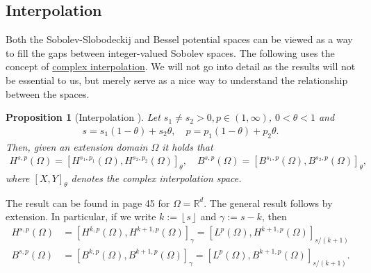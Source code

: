 \documentclass[
    a4paper,
    DIV=14,
    abstract=true,
    numbers=noenddot
]
{scrartcl}
\newtheorem{proposition}[theorem]{Proposition}
\theoremstyle{definition}
\newcommand{\R}{\mathbb{R}}
\begin{document}
\subsection{Interpolation}\label{interpolation section}
Both the Sobolev-Slobodeckij and Bessel potential spaces can be viewed as a way to fill the gaps between integer-valued Sobolev spaces. The following uses the concept of \href{https://en.wikipedia.org/wiki/Interpolation_space}{complex interpolation}. We will not go into detail as the results will not be essential to us, but merely serve as a nice way to understand the relationship between the spaces.
\begin{proposition}[Interpolation ]\label{interpolation}
    Let $s_1 \neq s_2 >0, p \in (1, \infty)$, $0<\theta<1$ and
    \begin{align*}
        s=s_1(1-\theta)+s_2 \theta, \quad p=p_1(1-\theta)+p_2 \theta.
    \end{align*}
    Then, given an extension domain $\Omega$  it holds that
    \begin{align*}
        H^{s,p}(\Omega )=\left[H^{s_1,p_1}(\Omega), H^{s_2,p_2}(\Omega)\right]_{\theta},\quad B^{s,p}(\Omega )=\left[B^{s_1,p}(\Omega ), B^{s_2, p}(\Omega )\right]_\theta,
    \end{align*}
    where $[X,Y]_\theta$ denotes the complex interpolation space.
\end{proposition}
The result can be found in \cite{triebel1992theory} page 45 for $\Omega = \R^d$. The general result follows by extension. In particular, if we write $k:=\left\lfloor s \right\rfloor$ and $\gamma:=s-k$, then
\begin{align*}
    H^{s,p}(\Omega ) & =\left[H^{k,p}(\Omega), H^{k+1,p}(\Omega)\right]_{\gamma }= \left[L^p(\Omega ), H^{k+1,p}(\Omega)\right]_{s/(k+1) }  \\
    B^{s,p}(\Omega ) & =\left[B^{k,p}(\Omega), B^{k+1,p}(\Omega)\right]_{\gamma }= \left[L^p(\Omega ), B^{k+1,p}(\Omega)\right]_{s/(k+1) }.
\end{align*}
\end{document}
